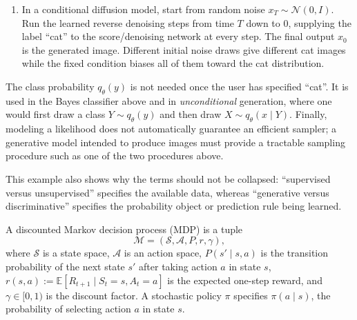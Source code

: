 \documentclass[11pt,a4paper]{article}
\theoremstyle{definition}
\begin{document}
\begin{example}
\begin{enumerate}[label=(\roman*)]
    \item In a conditional diffusion model, start from random noise
    $x_T\sim\mathcal{N}(0,I)$. Run the learned reverse denoising steps from time $T$ down to
    $0$, supplying the label ``cat'' to the score/denoising network at every step. The final
    output $x_0$ is the generated image. Different initial noise draws give different cat
    images while the fixed condition biases all of them toward the cat distribution.
\end{enumerate}
The class probability $q_\theta(y)$ is not needed once the user has specified ``cat''.
It is used in the Bayes classifier above and in \emph{unconditional} generation, where one
would first draw a class $Y\sim q_\theta(y)$ and then draw
$X\sim q_\theta(x\mid Y)$. Finally, modeling a likelihood does not automatically guarantee
an efficient sampler; a generative model intended to produce images must provide a tractable
sampling procedure such as one of the two procedures above.

This example also shows why the terms should not be collapsed: ``supervised versus
unsupervised'' specifies the available data, whereas ``generative versus discriminative''
specifies the probability object or prediction rule being learned.
\end{example}

\begin{definition}\label{def:mdp}
A discounted Markov decision process (MDP) is a tuple
\[
\mathcal{M}=(\mathcal{S},\mathcal{A},P,r,\gamma),
\]
where $\mathcal{S}$ is a state space, $\mathcal{A}$ is an action space,
$P(s'\mid s,a)$ is the transition probability of the next state $s'$ after taking action
$a$ in state $s$, $r(s,a):=\mathbb{E}[R_{t+1}\mid S_t=s,A_t=a]$ is the expected one-step
reward, and
$\gamma\in[0,1)$ is the discount factor. A stochastic policy $\pi$ specifies
$\pi(a\mid s)$, the probability of selecting action $a$ in state $s$.
\end{definition}
\end{document}
